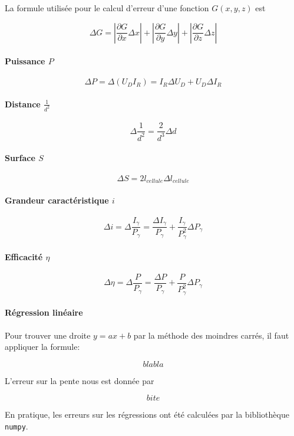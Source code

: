 La formule utilisée pour le calcul d'erreur d'une fonction \(G(x,y,z)\) est \cite{erreursmesure}

\begin{equation*}
    \Delta G = \left|\frac{\partial{G}}{\partial{x}}\Delta x\right| + \left|\frac{\partial{G}}{\partial{y}}\Delta y\right| + \left|\frac{\partial{G}}{\partial{z}}\Delta z\right|
\end{equation*}

\paragraph*{Puissance \(P\)}
\[ \Delta P = \Delta (U_D I_R) = I_R \Delta U_D + U_D \Delta I_R \]

\paragraph*{Distance \(\frac{1}{d^2}\)}
\[ \Delta \frac{1}{d^2} = \frac{2}{d^3}\Delta d\]

\paragraph*{Surface \(S\)}
\[ \Delta S = 2 l_{cellule} \Delta l_{cellule} \]

\paragraph*{Grandeur caractéristique \(i\)}
\[ \Delta i = \Delta \frac{I_\gamma}{P_\gamma} = \frac{\Delta I_\gamma}{P_\gamma} + \frac{I_\gamma}{P_\gamma^2} \Delta P_\gamma \]

\paragraph*{Efficacité \(\eta\)}
\[ \Delta \eta = \Delta \frac{P}{P_\gamma} = \frac{\Delta P}{P_\gamma} + \frac{P}{P_\gamma^2} \Delta P_\gamma\]

\paragraph*{Régression linéaire}
Pour trouver une droite \(y = ax+b\) par la méthode des moindres carrés,
il faut appliquer la formule:

\[ blabla \]

L'erreur sur la pente nous est donnée par

\[ bite \]

En pratique, les erreurs sur les régressions ont été calculées par la bibliothèque \texttt{numpy}.
